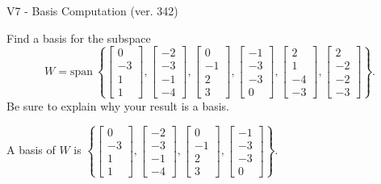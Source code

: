\begin{exercise}
  \begin{exerciseTitle}V7 - Basis Computation (ver. 342)\end{exerciseTitle}
  \begin{exerciseStatement}
    Find a basis for the subspace 
\[W=\mathrm{span}\ \left\{\left[\begin{array}{r}
0 \\
-3 \\
1 \\
1
\end{array}\right] , \left[\begin{array}{r}
-2 \\
-3 \\
-1 \\
-4
\end{array}\right] , \left[\begin{array}{r}
0 \\
-1 \\
2 \\
3
\end{array}\right] , \left[\begin{array}{r}
-1 \\
-3 \\
-3 \\
0
\end{array}\right] , \left[\begin{array}{r}
2 \\
1 \\
-4 \\
-3
\end{array}\right] , \left[\begin{array}{r}
2 \\
-2 \\
-2 \\
-3
\end{array}\right]\right\}.\]
 Be sure to explain why your result is a basis.


  \end{exerciseStatement}
  \begin{exerciseAnswer}
   A basis of \(W\) is  \(\left\{\left[\begin{array}{r}
0 \\
-3 \\
1 \\
1
\end{array}\right] , \left[\begin{array}{r}
-2 \\
-3 \\
-1 \\
-4
\end{array}\right] , \left[\begin{array}{r}
0 \\
-1 \\
2 \\
3
\end{array}\right] , \left[\begin{array}{r}
-1 \\
-3 \\
-3 \\
0
\end{array}\right]\right\}\).
  


  \end{exerciseAnswer}
\end{exercise}